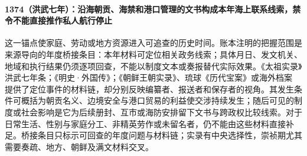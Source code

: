 \paragraph{1374（洪武七年）：沿海朝贡、海禁和港口管理的文书构成本年海上联系线索，禁令不能直接推作私人航行停止} 这一锚点使家庭、劳动或地方资源进入可追查的历史时间。账本注明的把握范围是来源导向的年度桥接条目：本年材料可定位相关政务线索；具体月日、发文机关、地域和执行结果仍须逐项回查，不能以制度文本或奏报替代实际效果。《太祖实录》洪武七年条；《明史·外国传》；《朝鲜王朝实录》、琉球《历代宝案》或海外档案 提供了定位事件的材料链，却分别反映编纂者、报送者和保存者的视角。其发生条件可概括为朝贡名义、边境安全与港口贸易的利益使交涉持续发生；随后可见的制度或社会影响是它为后续册封、互市或海防安排留下文书与跨政权比较线索。对于日常生活、性别与家庭分工、非精英劳作或未留名者，仍不能由这些材料直接补足。桥接条目只标示可回查的年度问题与材料链；实录有中央选择性，崇祯期尤其需要奏疏、地方、朝鲜及满文材料交叉。
